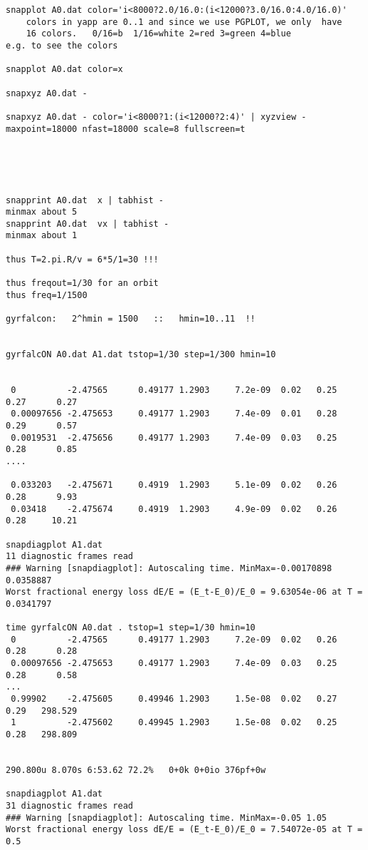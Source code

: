 \begin{itemize}
\begin{itemize}
\begin{verbatim}
snapplot A0.dat color='i<8000?2.0/16.0:(i<12000?3.0/16.0:4.0/16.0)'
    colors in yapp are 0..1 and since we use PGPLOT, we only  have
    16 colors.   0/16=b  1/16=white 2=red 3=green 4=blue
e.g. to see the colors

snapplot A0.dat color=x

snapxyz A0.dat - 

snapxyz A0.dat - color='i<8000?1:(i<12000?2:4)' | xyzview - maxpoint=18000 nfast=18000 scale=8 fullscreen=t





snapprint A0.dat  x | tabhist -
minmax about 5
snapprint A0.dat  vx | tabhist -
minmax about 1

thus T=2.pi.R/v = 6*5/1=30 !!!

thus freqout=1/30 for an orbit
thus freq=1/1500 

gyrfalcon:   2^hmin = 1500   ::   hmin=10..11  !!


gyrfalcON A0.dat A1.dat tstop=1/30 step=1/300 hmin=10


 0          -2.47565      0.49177 1.2903     7.2e-09  0.02   0.25       0.27      0.27
 0.00097656 -2.475653     0.49177 1.2903     7.4e-09  0.01   0.28       0.29      0.57
 0.0019531  -2.475656     0.49177 1.2903     7.4e-09  0.03   0.25       0.28      0.85
....

 0.033203   -2.475671     0.4919  1.2903     5.1e-09  0.02   0.26       0.28      9.93
 0.03418    -2.475674     0.4919  1.2903     4.9e-09  0.02   0.26       0.28     10.21

snapdiagplot A1.dat
11 diagnostic frames read
### Warning [snapdiagplot]: Autoscaling time. MinMax=-0.00170898 0.0358887
Worst fractional energy loss dE/E = (E_t-E_0)/E_0 = 9.63054e-06 at T = 0.0341797

time gyrfalcON A0.dat . tstop=1 step=1/30 hmin=10
 0          -2.47565      0.49177 1.2903     7.2e-09  0.02   0.26       0.28      0.28
 0.00097656 -2.475653     0.49177 1.2903     7.4e-09  0.03   0.25       0.28      0.58
...
 0.99902    -2.475605     0.49946 1.2903     1.5e-08  0.02   0.27       0.29   298.529
 1          -2.475602     0.49945 1.2903     1.5e-08  0.02   0.25       0.28   298.809


290.800u 8.070s 6:53.62 72.2%   0+0k 0+0io 376pf+0w

snapdiagplot A1.dat
31 diagnostic frames read
### Warning [snapdiagplot]: Autoscaling time. MinMax=-0.05 1.05
Worst fractional energy loss dE/E = (E_t-E_0)/E_0 = 7.54072e-05 at T = 0.5




\end{verbatim}
\end{itemize}
\end{itemize}
